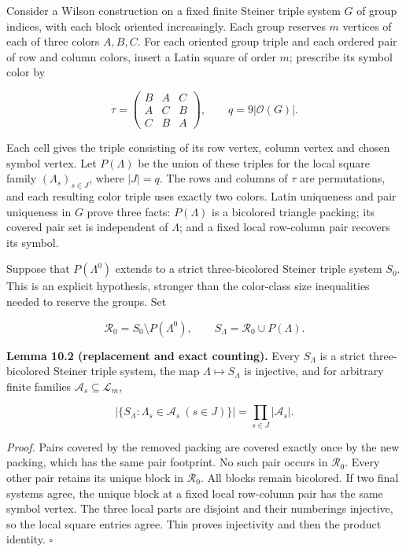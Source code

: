\documentclass[english,11pt,a4paper]{article}
\begin{document}
Consider a Wilson construction on a fixed finite Steiner triple system \(G\) of group indices, with each block oriented increasingly. Each group reserves \(m\) vertices of each of three colors \(A,B,C\). For each oriented group triple and each ordered pair of row and column colors, insert a Latin square of order \(m\); prescribe its symbol color by

\nopagebreak[4]
\[\tau=\begin{pmatrix}B&A&C\\A&C&B\\C&B&A\end{pmatrix},\qquad
q=9|\mathcal O(G)|.\tag{10.2}\]

Each cell gives the triple consisting of its row vertex, column vertex and chosen symbol vertex. Let \(P(\Lambda)\) be the union of these triples for the local square family \((\Lambda_s)_{s\in J}\), where \(|J|=q\). The rows and columns of \(\tau\) are permutations, and each resulting color triple uses exactly two colors. Latin uniqueness and pair uniqueness in \(G\) prove three facts: \(P(\Lambda)\) is a bicolored triangle packing; its covered pair set is independent of \(\Lambda\); and a fixed local row-column pair recovers its symbol.

Suppose that \(P(\Lambda^0)\) extends to a strict three-bicolored Steiner triple system \(S_0\). This is an explicit hypothesis, stronger than the color-class size inequalities needed to reserve the groups. Set

\nopagebreak[4]
\[\mathcal R_0=S_0\setminus P(\Lambda^0),\qquad S_\Lambda=\mathcal R_0\cup P(\Lambda).\tag{10.3}\]

\textbf{Lemma 10.2 (replacement and exact counting).} Every \(S_\Lambda\) is a strict three-bicolored Steiner triple system, the map \(\Lambda\mapsto S_\Lambda\) is injective, and for arbitrary finite families \(\mathcal A_s\subseteq\mathcal L_m\),

\nopagebreak[4]
\[\left|\{S_\Lambda:\Lambda_s\in\mathcal A_s\ (s\in J)\}\right|
=\prod_{s\in J}|\mathcal A_s|.\tag{10.4}\]

\emph{Proof.} Pairs covered by the removed packing are covered exactly once by the new packing, which has the same pair footprint. No such pair occurs in \(\mathcal R_0\). Every other pair retains its unique block in \(\mathcal R_0\). All blocks remain bicolored. If two final systems agree, the unique block at a fixed local row-column pair has the same symbol vertex. The three local parts are disjoint and their numberings injective, so the local square entries agree. This proves injectivity and then the product identity. \(\square\)
\end{document}
